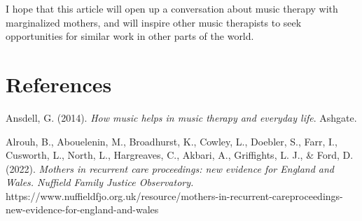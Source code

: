 \documentclass[authordate, empirical, issue]{jote-new-article}
\begin{document}
I hope that this article will open up a conversation about music therapy with marginalized mothers, and will inspire other music therapists to seek opportunities for similar work in other parts of the world.

























































\vspace*{\baselineskip}

\section{References}







\hspace*{\parindent}Ansdell, G. (2014). \emph{How music helps in music therapy and everyday life}. Ashgate.







Alrouh, B., Abouelenin, M., Broadhurst, K., Cowley, L., Doebler, S., Farr, I., Cusworth, L., North, L., Hargreaves, C., Akbari, A., Griffights, L. J., \& Ford, D. (2022). \emph{Mothers in recurrent care proceedings: new evidence for England and Wales. Nuffield Family Justice Observatory.} https://www.nuffieldfjo.org.uk/resource/mothers-in-recurrent-careproceedings-new-evidence-for-england-and-wales
\end{document}
